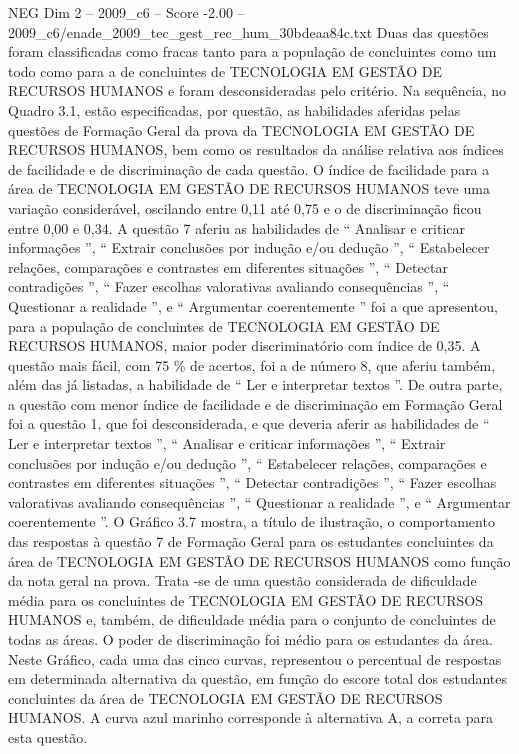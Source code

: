 \begin{textsample}{NEG Dim 2 – 2009\_c6 – Score -2.00 – 2009\_c6/enade\_2009\_tec\_gest\_rec\_hum\_30bdeaa84c.txt}
Duas das questões foram classificadas como fracas tanto para a população de concluintes como um todo como para a de concluintes de TECNOLOGIA EM GESTÃO DE RECURSOS HUMANOS e foram desconsideradas pelo critério.
Na sequência, no Quadro 3.1, estão especificadas, por questão, as habilidades aferidas pelas questões de Formação Geral da prova da TECNOLOGIA EM GESTÃO DE RECURSOS HUMANOS, bem como os resultados da análise relativa aos índices de facilidade e de discriminação de cada questão.
O índice de facilidade para a área de TECNOLOGIA EM GESTÃO DE RECURSOS HUMANOS teve uma variação considerável, oscilando entre 0,11 até 0,75 e o de discriminação ficou entre 0,00 e 0,34.
A questão 7 aferiu as habilidades de “ Analisar e criticar informações ”, “ Extrair conclusões por indução e/ou dedução ”, “ Estabelecer relações, comparações e contrastes em diferentes situações ”, “ Detectar contradições ”, “ Fazer escolhas valorativas avaliando consequências ”, “ Questionar a realidade ”, e “ Argumentar coerentemente ” foi a que apresentou, para a população de concluintes de TECNOLOGIA EM GESTÃO DE RECURSOS HUMANOS, maior poder discriminatório com índice de 0,35.
A questão mais fácil, com 75 \% de acertos, foi a de número 8, que aferiu também, além das já listadas, a habilidade de “ Ler e interpretar textos ”.
De outra parte, a questão com menor índice de facilidade e de discriminação em Formação Geral foi a questão 1, que foi desconsiderada, e que deveria aferir as habilidades de “ Ler e interpretar textos ”, “ Analisar e criticar informações ”, “ Extrair conclusões por indução e/ou dedução ”, “ Estabelecer relações, comparações e contrastes em diferentes situações ”, “ Detectar contradições ”, “ Fazer escolhas valorativas avaliando consequências ”, “ Questionar a realidade ”, e “ Argumentar coerentemente ”.
O Gráfico 3.7 mostra, a título de ilustração, o comportamento das respostas à questão 7 de Formação Geral para os estudantes concluintes da área de TECNOLOGIA EM GESTÃO DE RECURSOS HUMANOS como função da nota geral na prova.
Trata -se de uma questão considerada de dificuldade média para os concluintes de TECNOLOGIA EM GESTÃO DE RECURSOS HUMANOS e, também, de dificuldade média para o conjunto de concluintes de todas as áreas.
O poder de discriminação foi médio para os estudantes da área.
Neste Gráfico, cada uma das cinco curvas, representou o percentual de respostas em determinada alternativa da questão, em função do escore total dos estudantes concluintes da área de TECNOLOGIA EM GESTÃO DE RECURSOS HUMANOS.
A curva azul marinho corresponde à alternativa A, a correta para esta questão.

\end{textsample}
